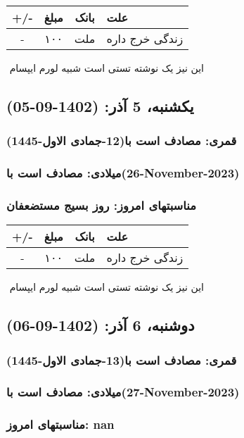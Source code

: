 \documentclass{article}
\newcommand{\rnote}[1]{\marginpar{\textcolor{color}{\StrSubstitute{\##1}{ }{\_}}}}
\newcommand{\myRow}[4]{
    #1 & #2 & #3 & #4 \\ \hline
}
\begin{document}
\begin{tabular}{ | c | c | c | p{5cm} |}
    \hline
    \myRow{ +/- }{مبلغ}{بانک}{علت}
    \myRow{-}{۱۰۰}{ملت}{زندگی خرج داره}
\end{tabular}
\newline
\newline

‌
\rnote{تست}
این نیز یک نوشته تستی است شبیه لورم ایپسام




\newpage
{}
\textcolor{color}{
\section{ یکشنبه، 5 آذر: (1402-09-05) }
\subsubsection*{قمری: مصادف است با(12-جمادی الاول-1445)} 
\subsubsection*{میلادی: مصادف است با(26-November-2023)}
\subsubsection*{مناسبتهای امروز: روز بسیج مستضعفان}
}


\begin{tabular}{ | c | c | c | p{5cm} |}
    \hline
    \myRow{ +/- }{مبلغ}{بانک}{علت}
    \myRow{-}{۱۰۰}{ملت}{زندگی خرج داره}
\end{tabular}
\newline
\newline

‌
\rnote{تست}
این نیز یک نوشته تستی است شبیه لورم ایپسام




\newpage
{}
\textcolor{color}{
\section{ دوشنبه، 6 آذر: (1402-09-06) }
\subsubsection*{قمری: مصادف است با(13-جمادی الاول-1445)} 
\subsubsection*{میلادی: مصادف است با(27-November-2023)}
\subsubsection*{مناسبتهای امروز: nan}
}
\end{document}

